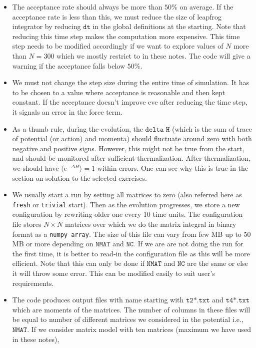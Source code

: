 \documentclass[letter,11pt]{article}
\begin{document}
\begin{itemize} 
\item The acceptance rate should always be more than $50\%$
on average. If the acceptance rate is less than this, we
must reduce the size of leapfrog integrator by reducing 
$\texttt{dt}$ in the global definitions at the starting. Note that 
reducing this time step makes the computation more expensive. 
This time step needs to be modified accordingly if we want to explore values of $N$
more than $N = 300$ which we mostly restrict to in these notes. The code will give a warning
if the acceptance falls below $50\%$.  
\item We must not change the step size during the entire time of simulation. It has to be 
chosen to a value where acceptance is reasonable and then kept constant. If the acceptance
doesn't improve eve after reducing the time step, it signals an error in the force term.
\item As a thumb rule, during the evolution, the $\texttt{delta H}$ (which is the sum of
trace of potential (or action) and momenta) should fluctuate around zero
with both negative and positive signs. However, this might not be true from the start, and should
be monitored after sufficient thermalization. After thermalization, we should have 
$\langle e^{-\Delta H} \rangle = 1$ within errors. One can see why this is true in the section on 
solution to the selected exercises. 
\item We usually start a run by setting all matrices to zero (also referred here as \texttt{fresh} or 
\texttt{trivial} start). Then as the evolution progresses, we store a new configuration by rewriting older one
every 10 time units. The configuration file stores $N \times N$ matrices over which we do the matrix integral 
in binary format as a \texttt{numpy array}. 
The size of this file can vary from few MB up to 50 MB or more depending on 
$\texttt{NMAT}$ and $\texttt{NC}$. If we are are not doing the run for the first time, 
it is better to read-in the configuration file as this will be more efficient.  
Note that this can only be done if $\texttt{NMAT}$ and $\texttt{NC}$ are the same or else
it will throw some error. This can be modified easily to suit user's requirements. 
\item The code produces output files with name starting with $\texttt{t2*.txt}$ and $\texttt{t4*.txt}$
which are moments of the matrices. The number of columns in these files will be equal to 
number of different matrices we considered in the potential i.e., $\texttt{NMAT}$. 
If we consider matrix model with ten matrices (maximum we have used in these notes),

\end{itemize}
\end{document}

